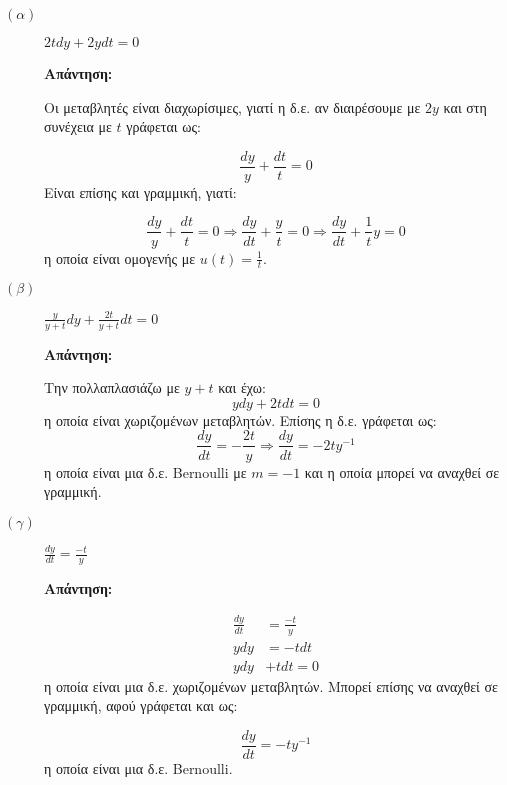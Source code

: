 \documentclass[a4paper,12pt]{article}
\begin{document}
\vspace{2\baselineskip}



\begin{description}
\item [$(\alpha)$] $\boxed{2tdy + 2ydt=0}$

\textbf{Απάντηση:}

\vspace{\baselineskip}

Οι μεταβλητές είναι διαχωρίσιμες, γιατί η δ.ε. αν διαιρέσουμε με $2y$ και στη συνέχεια με $t$ γράφεται ως:

\[
\frac{dy}{y}+\frac{dt}{t}=0
\]
Είναι επίσης και γραμμική, γιατί:

\[
\frac{dy}{y}+\frac{dt}{t}=0 \Rightarrow
\frac{dy}{dt}+\frac{y}{t}=0 \Rightarrow
\frac{dy}{dt}+\frac{1}{t}y=0
\]
η οποία είναι ομογενής με $u(t)=\frac{1}{t}$.

\vspace{\baselineskip}

\item [$(\beta)$] $\boxed{\frac{y}{y+t}dy + \frac{2t}{y+t}dt=0}$


\textbf{Απάντηση:}

\vspace{\baselineskip}

Την πολλαπλασιάζω με $y+t$ και έχω:
\[
ydy+2tdt=0
\]
η οποία είναι χωριζομένων μεταβλητών. Επίσης η δ.ε. γράφεται ως:
\[
\frac{dy}{dt}=-\frac{2t}{y} \Rightarrow \frac{dy}{dt}=-2ty^{-1}
\]
η οποία είναι μια δ.ε. \textlatin{Bernoulli} με $m=-1$ και η οποία μπορεί να αναχθεί σε γραμμική.

\vspace{\baselineskip}

\item [$(\gamma)$] $\boxed{\frac{dy}{dt}=\frac{-t}{y}}$

\textbf{Απάντηση:}

\vspace{\baselineskip}

\begin{align*}
\frac{dy}{dt}&=\frac{-t}{y} \\
ydy&=-tdt\\
ydy&+tdt=0
\end{align*}
η οποία είναι μια δ.ε. χωριζομένων μεταβλητών. Μπορεί επίσης να αναχθεί σε γραμμική, αφού γράφεται και ως:

\[
\frac{dy}{dt}=-ty^{-1}
\]
η οποία είναι μια δ.ε. \textlatin{Bernoulli}.


\end{description}
\end{document}
